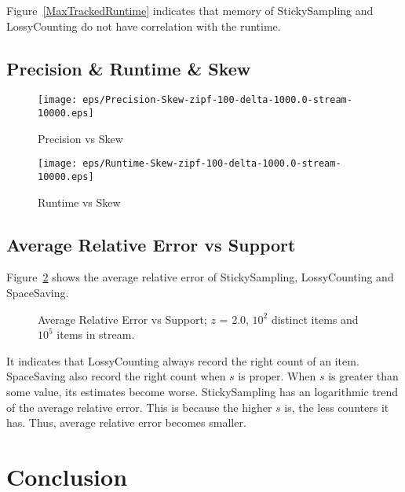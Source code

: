 \documentclass[10pt]{article}
\begin{document}
Figure~\ref{MaxTrackedRuntime} indicates that memory of StickySampling and LossyCounting
do not have correlation with the runtime. 

\subsection{Precision \& Runtime \& Skew}

\begin{figure}[!htb]
      \begin{minipage}{0.48\textwidth}
        \centering
        \texttt{[image: eps/Precision-Skew-zipf-100-delta-1000.0-stream-10000.eps]}
        \caption{Precision vs Skew}
        \label{PrecisionSkew}
      \end{minipage}\hfill
      \begin{minipage}{0.48\textwidth}
        \centering
        \texttt{[image: eps/Runtime-Skew-zipf-100-delta-1000.0-stream-10000.eps]}
        \caption{Runtime vs Skew}
        \label{RuntimeSkew}
      \end{minipage}
\end{figure}

\subsection{Average Relative Error vs Support}
Figure~\ref{AverageRelativeErrorSupport} shows the average relative error of StickySampling, LossyCounting and SpaceSaving.

 \begin{figure}[t]
      \centering
     \begin{subfigure}[b]{0.6\textwidth}
      \centering
      \end{subfigure}
      \caption{Average Relative Error vs Support; $z$ = 2.0, $10^2$ distinct items and $10^5$ items in stream.}  
      \label{AverageRelativeErrorSupport}
 \end{figure}
It indicates that 
 LossyCounting always record the right count of an item.
 SpaceSaving also record the right count when $s$ is proper. 
 When $s$ is greater than some value, its estimates become worse.
 StickySampling has an logarithmic trend of the average relative error.
 This is because the higher $s$ is, the less counters it has. 
 Thus, average relative error becomes smaller.

 \section{Conclusion}\label{conclusion}

 \clearpage


\end{document}
